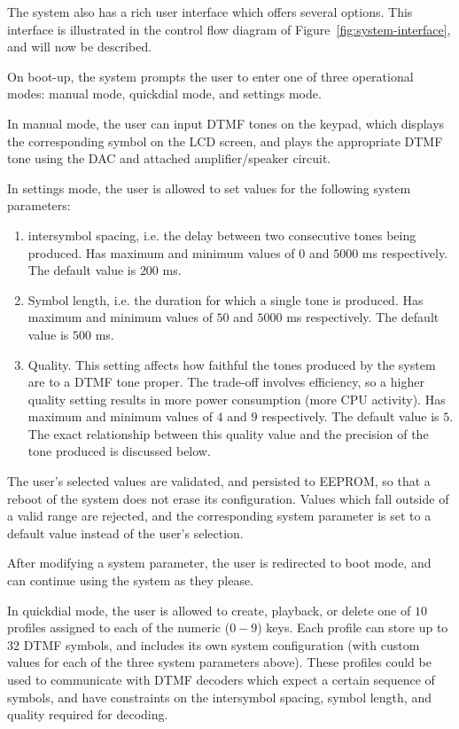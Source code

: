 \documentclass[11pt,a4paper,twocolumn]{scrartcl}
\begin{document}
   The system also has a rich user interface which offers several options. This interface is illustrated in the control flow diagram of Figure~\ref{fig:system-interface}, and will now be described.

   On boot-up, the system prompts the user to enter one of three operational modes: manual mode, quickdial mode, and settings mode.

   In manual mode, the user can input DTMF tones on the keypad, which displays the corresponding symbol on the LCD screen, and plays the appropriate DTMF tone using the DAC and attached amplifier/speaker circuit.

   In settings mode, the user is allowed to set values for the following system parameters:
   \begin{enumerate}
      \item intersymbol spacing, i.e. the delay between two consecutive tones being produced. Has maximum and minimum values of $0$ and $5000$ ms respectively. The default value is $200$ ms.
      \item Symbol length, i.e. the duration for which a single tone is produced. Has maximum and minimum values of $50$ and $5000$ ms respectively. The default value is $500$ ms.
      \item Quality. This setting affects how faithful the tones produced by the system are to a DTMF tone proper. The trade-off involves efficiency, so a higher quality setting results in more power consumption (more CPU activity). Has maximum and minimum values of $4$ and $9$ respectively. The default value is $5$. The exact relationship between this quality value and the precision of the tone produced is discussed below.
   \end{enumerate}

   The user's selected values are validated, and persisted to EEPROM, so that a reboot of the system does not erase its configuration. Values which fall outside of a valid range are rejected, and the corresponding system parameter is set to a default value instead of the user's selection.

   After modifying a system parameter, the user is redirected to boot mode, and can continue using the system as they please.

   In quickdial mode, the user is allowed to create, playback, or delete one of $10$ profiles assigned to each of the numeric ($0-9$) keys. Each profile can store up to $32$ DTMF symbols, and includes its own system configuration (with custom values for each of the three system parameters above). These profiles could be used to communicate with DTMF decoders which expect a certain sequence of symbols, and have constraints on the intersymbol spacing, symbol length, and quality required for decoding.
\end{document}
